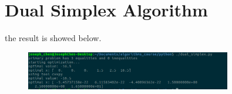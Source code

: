 \section{Dual Simplex Algorithm}
the result is showed below.
\begin{figure}[H]
	\centering
	\includegraphics[width = 0.8\textwidth]{work4/simplex}
\end{figure}